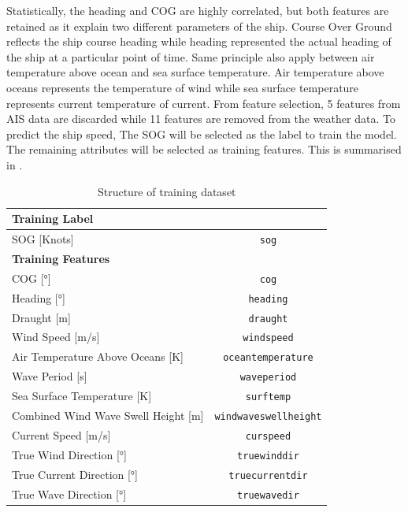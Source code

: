 Statistically, the heading and COG are highly correlated, but both features are retained as it explain two different parameters of the ship. Course Over Ground reflects the ship course heading while heading represented the actual heading of the ship at a particular point of time. Same principle also apply between air temperature above ocean and sea surface temperature. Air temperature above oceans represents the temperature of wind while sea surface temperature represents current temperature of current. From feature selection, 5 features from AIS data are discarded while 11 features are removed from the weather data. To predict the ship speed, The SOG will be selected as the label to train the model. The remaining attributes will be selected as training features. This is summarised in .\\

\begin{table}
    \footnotesize
    \centering
    {\begin{tabular}{ p{8cm}c }
    \hline
    \multicolumn{2}{l}{\textbf{Training Label}}\\
    \hline
    SOG [Knots] & {\tt sog} \\
    \hline
    \multicolumn{2}{l}{\textbf{Training Features}}\\
    \hline
    COG [°] & {\tt cog}  \\
    Heading [°] & {\tt heading}  \\
    Draught [m] & {\tt draught} \\
    Wind Speed [m/s] & {\tt windspeed} \\
    Air Temperature Above Oceans [K] & {\tt oceantemperature} \\
    Wave Period [s] & {\tt waveperiod}\\
    Sea Surface Temperature [K] & {\tt surftemp}\\
    Combined Wind Wave Swell Height [m] &  {\tt windwaveswellheight} \\
    Current Speed [m/s] & {\tt curspeed} \\
    True Wind Direction [°] & {\tt truewinddir}  \\
    True Current Direction [°] & {\tt truecurrentdir} \\
    True Wave Direction [°] & {\tt truewavedir} \\
    \hline
    \end{tabular}}
\caption{Structure of training dataset}\label{tbl:struct_train_final}
\end{table}

